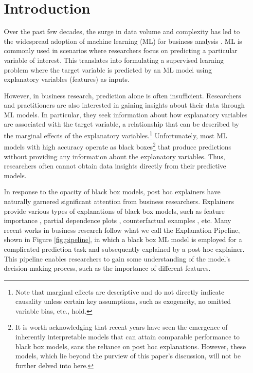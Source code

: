 \documentclass[mnsc,blindrev]{informs3}
\begin{document}
\section{Introduction}

Over the past few decades, the surge in data volume and complexity has led to the widespread adoption of machine learning (ML) for business analysis \citep{kleinberg2015prediction,mullainathan17applied}. ML is commonly used in scenarios where researchers focus on predicting a particular variable of interest. This translates into formulating a supervised learning problem where the target variable is predicted by an ML model using explanatory variables (features) as inputs.

However, in business research, prediction alone is often insufficient. Researchers and practitioners are also interested in gaining insights about their data through ML models. In particular, they seek information about how explanatory variables are associated with the target variable, a relationship that can be described by the marginal effects of the explanatory variables.\footnote{Note that marginal effects are descriptive and do not directly indicate causality unless certain key assumptions, such as exogeneity, no omitted variable bias, etc., hold.} 
Unfortunately, most ML models with high accuracy operate as black boxes\footnote{It is worth acknowledging that recent years have seen the emergence of inherently interpretable models that can attain comparable performance to black box models, sans the reliance on post hoc explanations. However, these models, which lie beyond the purview of this paper's discussion, will not be further delved into here.} that produce predictions without providing any information about the explanatory variables. Thus, researchers often cannot obtain data insights directly from their predictive models.


In response to the opacity of black box models, post hoc explainers have naturally garnered significant attention from business researchers. Explainers provide various types of explanations of black box models, such as feature importance \citep{ribeiro16lime,lundberg17shap}, partial dependence plots \citep{friedman01pdp}, counterfactual examples \citep{mothilal20dice}, etc. Many recent works in business research follow what we call the Explanation Pipeline, shown in Figure \ref{fig:pipeline}, in which a black box ML model is employed for a complicated prediction task and subsequently explained by a post hoc explainer. This pipeline enables researchers to gain some understanding of the model's decision-making process, such as the importance of different features. %
\end{document}
